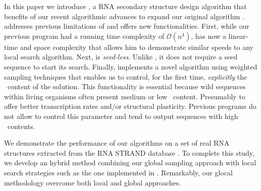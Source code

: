 In this paper we introduce \ourprog, a RNA secondary structure design algorithm that benefits of our recent algorithmic advances \cite{Reinharz:2013aa} to expand our original \RNAensign algorithm \cite{Levin:2012kx}. \ourprog addresses previous limitations of \RNAensign and offers new functionalities. First, while our previous program had a running time complexity of $\mathcal{O}(n^4)$, \ourprog has now a linear-time and space complexity that allows him to demonstrate similar speeds to any local search algorithm. Next, \ourprog is \textit{seed-less}. Unlike \RNAensign, it does not require a seed sequence to start its search. Finally, \ourprog implements a novel algorithm using weighted sampling techniques \cite{Bodini2010} that enables us to control, for the first time, \textit{explicitly} the \gc~content of the solution. This functionality is essential because wild sequences within living organisms often present medium or low \gc~content. Presumably to offer better transcription rates and/or structural plasticity. Previous programs do not allow to control this parameter and tend to output sequences with high \gc~contents. 

We demonstrate the performance of our algorithms on a set of real RNA structures extracted from the \textsf{RNA STRAND} database \cite{andronescu2008rna}. To complete this study, we develop an hybrid method combining our global sampling approach with local search strategies such as the one implemented in \RNAinverse. Remarkably, our glocal methodology overcome both local and global approaches.